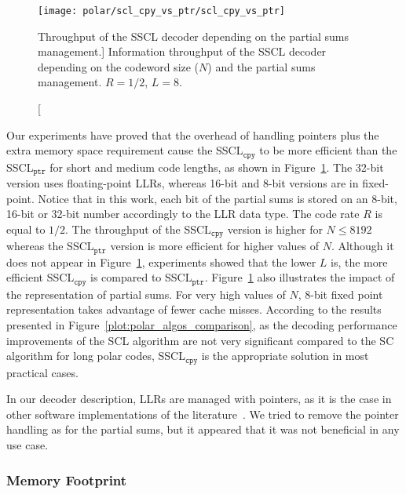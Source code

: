 \begin{figure}[htp]
  \centering
  \texttt{[image: polar/scl\_cpy\_vs\_ptr/scl\_cpy\_vs\_ptr]}
  \caption
    [Throughput of the SSCL decoder depending on the partial sums management.]
    {Information throughput of the SSCL decoder depending on the codeword
    size ($N$) and the partial sums management. $R = 1 / 2$, $L = 8$.}
  \label{plot:polar_scl_cpy_vs_ptr}
\end{figure}

Our experiments have proved that the overhead of handling pointers plus the
extra memory space requirement cause the SSCL$_{\texttt{cpy}}$ to be more
efficient than the SSCL$_{\texttt{ptr}}$ for short and medium code lengths, as
shown in Figure~\ref{plot:polar_scl_cpy_vs_ptr}. The 32-bit version uses
floating-point LLRs, whereas 16-bit and 8-bit versions are in fixed-point.
Notice that in this work, each bit of the partial sums is stored on an 8-bit,
16-bit or 32-bit number accordingly to the LLR data type. The code rate $R$ is
equal to $1/2$. The throughput of the SSCL$_{\texttt{cpy}}$ version is higher
for $N \leq 8192$ whereas the SSCL$_{\texttt{ptr}}$ version is more efficient
for higher values of $N$. Although it does not appear in
Figure~\ref{plot:polar_scl_cpy_vs_ptr}, experiments showed that the lower $L$
is, the more efficient SSCL$_{\texttt{cpy}}$ is compared to
SSCL$_{\texttt{ptr}}$. Figure~\ref{plot:polar_scl_cpy_vs_ptr} also illustrates
the impact of the representation of partial sums. For very high values of $N$,
8-bit fixed point representation takes advantage of fewer cache misses.
According to the results presented in Figure~\ref{plot:polar_algos_comparison},
as the decoding performance improvements of the SCL algorithm are not very
significant compared to the SC algorithm for long polar codes,
SSCL$_{\texttt{cpy}}$ is the appropriate solution in most practical cases.

In our decoder description, LLRs are managed with pointers, as it is the case in
other software implementations of the
literature~\cite{Sarkis2014b,Sarkis2016,Shen2016}. We tried to remove the
pointer handling as for the partial sums, but it appeared that it was not
beneficial in any use case.

\subsubsection{Memory Footprint}

